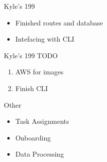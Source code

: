 
\begin{frame}{Kyle's 199}
    \begin{itemize}
        \item Finished routes and database
        \item Intefacing with CLI
    \end{itemize}    
\end{frame}

\begin{frame}{Kyle's 199 TODO}
    \begin{enumerate}
        \item AWS for images
        \item Finish CLI
    \end{enumerate}
\end{frame}

\begin{frame}{Other}
    \begin{itemize}
        \item Task Assignments
        \item Onboarding
        \item Data Processing
    \end{itemize}    
\end{frame}



